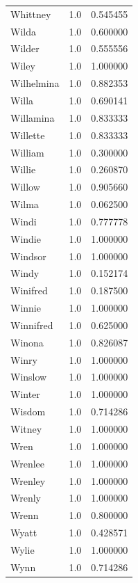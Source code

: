 \documentclass[
  letterpaper,
  DIV=11,
  numbers=noendperiod]{scrreprt}
\begin{document}
\begin{tabular}{lrr}
Whittney        &   1.0 &   0.545455 \\
Wilda           &   1.0 &   0.600000 \\
Wilder          &   1.0 &   0.555556 \\
Wiley           &   1.0 &   1.000000 \\
Wilhelmina      &   1.0 &   0.882353 \\
Willa           &   1.0 &   0.690141 \\
Willamina       &   1.0 &   0.833333 \\
Willette        &   1.0 &   0.833333 \\
William         &   1.0 &   0.300000 \\
Willie          &   1.0 &   0.260870 \\
Willow          &   1.0 &   0.905660 \\
Wilma           &   1.0 &   0.062500 \\
Windi           &   1.0 &   0.777778 \\
Windie          &   1.0 &   1.000000 \\
Windsor         &   1.0 &   1.000000 \\
Windy           &   1.0 &   0.152174 \\
Winifred        &   1.0 &   0.187500 \\
Winnie          &   1.0 &   1.000000 \\
Winnifred       &   1.0 &   0.625000 \\
Winona          &   1.0 &   0.826087 \\
Winry           &   1.0 &   1.000000 \\
Winslow         &   1.0 &   1.000000 \\
Winter          &   1.0 &   1.000000 \\
Wisdom          &   1.0 &   0.714286 \\
Witney          &   1.0 &   1.000000 \\
Wren            &   1.0 &   1.000000 \\
Wrenlee         &   1.0 &   1.000000 \\
Wrenley         &   1.0 &   1.000000 \\
Wrenly          &   1.0 &   1.000000 \\
Wrenn           &   1.0 &   0.800000 \\
Wyatt           &   1.0 &   0.428571 \\
Wylie           &   1.0 &   1.000000 \\
Wynn            &   1.0 &   0.714286 \\

\end{tabular}
\end{document}
